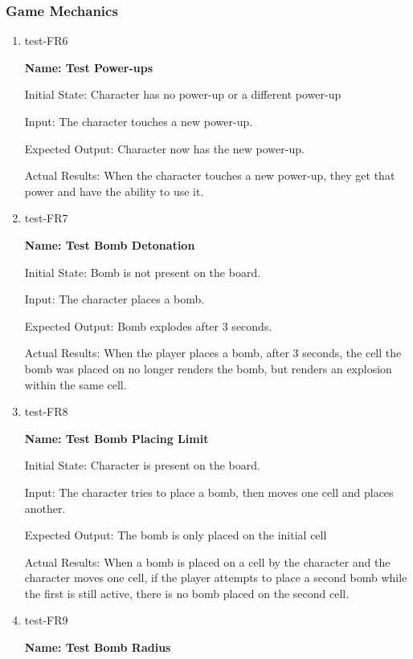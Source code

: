 \documentclass[12pt, titlepage]{article}
\begin{document}
\subsubsection{Game Mechanics}
\begin{enumerate}
\item{test-FR6\\}

\textbf{Name: Test Power-ups}

Initial State: Character has no power-up or a different power-up
					
Input: The character touches a new power-up.
					
Expected Output: Character now has the new power-up.

Actual Results: When the character touches a new power-up, they get that power and have the ability to use it. 

\item{test-FR7\\}

\textbf{Name: Test Bomb Detonation}

Initial State: Bomb is not present on the board.
					
Input: The character places a bomb.
					
Expected Output: Bomb explodes after 3 seconds.

Actual Results: When the player places a bomb, after 3 seconds, the cell the bomb was placed on no longer renders the bomb, but renders an explosion within the same cell.


\item{test-FR8\\}

\textbf{Name: Test Bomb Placing Limit}

Initial State: Character is present on the board.
					
Input: The character tries to place a bomb, then moves one cell and places another.
					
Expected Output: The bomb is only placed on the initial cell

Actual Results: When a bomb is placed on a cell by the character and the character moves one cell, if the player attempts to place a second bomb while the first is still active, there is no bomb placed on the second cell. 

\item{test-FR9\\}

\textbf{Name: Test Bomb Radius}


\end{enumerate}
\end{document}
